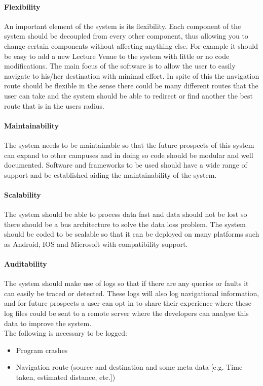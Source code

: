 \documentclass[runningheads,a4paper]{llncs}
\begin{document}
\paragraph{Flexibility \\}
An important element of the system is its flexibility. 
Each component of the system should be decoupled from every other component, thus allowing you to change certain components without affecting anything else. 
For example it should be easy to add a new Lecture Venue to the system with little or no code modifications. 
The main focus of the software is to allow the user to easily navigate to his/her destination with minimal effort.
In spite of this the navigation route should be flexible in the sense there could be many different routes that the user can take and the system should be able to redirect or find another the best route that is in the users radius.

\paragraph{Maintainability \\}
The system needs to be maintainable so that the future prospects of this system can expand to other campuses and in doing so code should be modular and well documented. Software and frameworks to be used should have a wide range of support and be established aiding the maintainability of the system.

\paragraph{Scalability \\}
The system should be able to process data fast and data should not be lost so there should be a bus architecture to solve the data loss problem. The system should be coded to be scalable so that it can be deployed on many platforms such as Android, IOS and Microsoft with compatibility support.

\paragraph{Auditability \\}
The system should make use of logs so that if there are any  queries or faults it can easily be traced or detected. These logs will also log navigational information, and for future prospects a user can opt in to share their experience where these log files could be sent to a remote server where the developers can analyse this data to improve the system. \\The following is necessary to be logged:
\begin{itemize}
	\item Program crashes
	\item Navigation route (source and destination and some meta data [e.g. Time taken, estimated distance, etc.])
\end{itemize}
\end{document}
